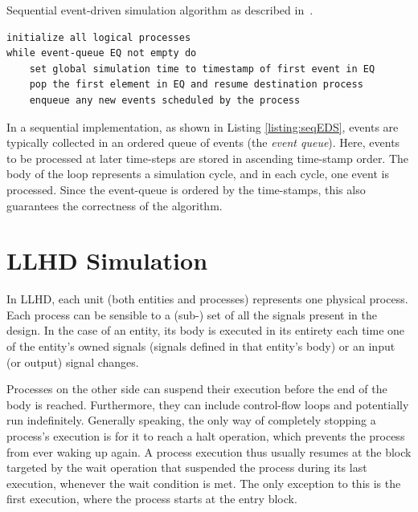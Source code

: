 \begin{listing}[ht]
    \caption{Sequential event-driven simulation algorithm as described in~\cite{Ashenden1994}.}
    \label{listing:seqEDS}
    \begin{verbatim}
initialize all logical processes
while event-queue EQ not empty do
    set global simulation time to timestamp of first event in EQ
    pop the first element in EQ and resume destination process
    enqueue any new events scheduled by the process
    \end{verbatim}
\end{listing}

In a sequential implementation, as shown in Listing \ref{listing:seqEDS}, events are typically collected in an ordered queue of events (the \textit{event queue}). Here, events to be processed at later time-steps are stored in ascending time-stamp order. The body of the loop represents a simulation cycle, and in each cycle, one event is processed. Since the event-queue is ordered by the time-stamps, this also guarantees the correctness of the algorithm.


\section{LLHD Simulation}
In LLHD, each unit (both entities and processes) represents one physical process. Each process can be sensible to a (sub-) set of all the signals present in the design.
In the case of an entity, its body is executed in its entirety each time one of the entity's owned signals (signals defined in that entity's body) or an input (or output) signal changes.

Processes on the other side can suspend their execution before the end of the body is reached. Furthermore, they can include control-flow loops and potentially run indefinitely. Generally speaking, the only way of completely stopping a process's execution is for it to reach a halt operation, which prevents the process from ever waking up again. A process execution thus usually resumes at the block targeted by the wait operation that suspended the process during its last execution, whenever the wait condition is met. The only exception to this is the first execution, where the process starts at the entry block.

